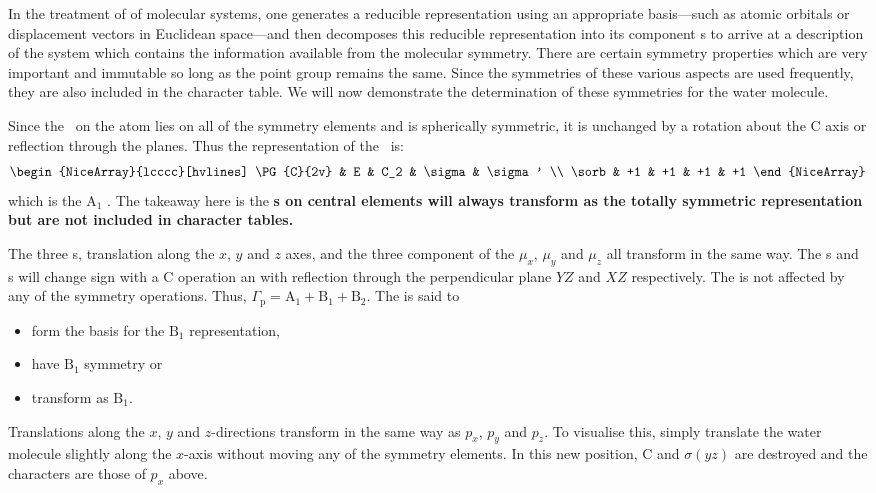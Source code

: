 
In the treatment of of molecular systems, one generates a reducible representation using an appropriate basis---such as
atomic orbitals or displacement vectors in Euclidean space---and then decomposes this reducible representation into its
component \irrep{}s to arrive at a description of the system which contains the information available from the
molecular symmetry.
There are certain symmetry properties which are very important and immutable so long as the point group remains the
same.
Since the symmetries of these various aspects are used frequently, they are also included in the character table.
We will now demonstrate the determination of these symmetries for the water molecule.

Since the \sorb\ on the  atom lies on all of the symmetry elements and is spherically symmetric, it is unchanged
by a rotation about the \symop[2]C axis or reflection through the planes.
Thus the representation of the \sorb\ is:
\begin{equation*}
	\begin{NiceArray}{lcccc}[hvlines]
		\PG{C}{2v} & E & C_2 & \sigma & \sigma' \\
		\sorb & +1 & +1 & +1 & +1
	\end{NiceArray}
\end{equation*}
\noindent which is the $\mathup A_1$ \irrep.
The takeaway here is the \textbf{\sorb{}s on central elements will always transform as the totally symmetric representation but are not included in character tables.}

The three \porb{}s, translation along the $x$, $y$ and $z$ axes, and the three component of the  $\mu_x$, $\mu_y$ and $\mu_z$ all transform in the same way.
The s and s will change sign with a \symop[2]C operation an with reflection through the perpendicular
plane $YZ$ and $XZ$ respectively.
The  is not affected by any of the symmetry operations.
Thus, $\Gamma_{\mathup p} = \mathup A_1 + \mathup B_1 + \mathup B_2$. The  is said to\begin{itemize}
	\item form the basis for the $\mathup B_1$ representation,
	\item have $\mathup B_1$ symmetry or
	\item transform as $\mathup B_1$.
\end{itemize}
\noindent Translations along the $x$, $y$ and $z$-directions transform in the same way as $p_x$, $p_y$ and $p_z$.
To visualise this, simply translate the water molecule slightly along the $x$-axis without moving any of the symmetry
elements.
In this new position, \symop[2]C and $\sigma(yz)$ are destroyed and the characters are those of $p_x$ above.

